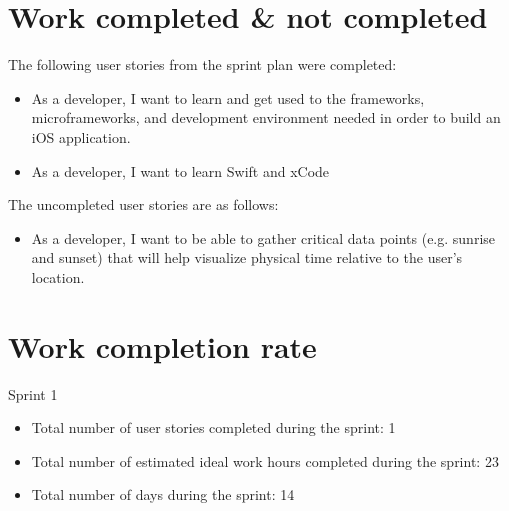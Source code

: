 \documentclass[11pt]{article}
\begin{document}
	\section{Work completed \& not completed}
		\vspace{-3mm}
		\normalsize{The following user stories from the sprint plan were completed:}\\
		\vspace{-3mm}
		\begin{itemize}
			\item As a developer, I want to learn and get used to the frameworks, microframeworks, and development environment needed in order to build an iOS application.
			\item As a developer, I want to learn Swift and xCode
		\end{itemize}
		\vspace{-3mm}
		\normalsize{The uncompleted user stories are as follows:}\\
		\vspace{-3mm}
		\begin{itemize}
			\item As a developer, I want to be able to gather critical data points (e.g. sunrise and sunset) that will help visualize physical time relative to the user's location.
		\end{itemize}
		\vspace{-3mm}

	\section{Work completion rate}
		\vspace{-3mm}
		\normalsize{Sprint 1}\\
		\vspace{-3mm}
		\begin{itemize}
			\item Total number of user stories completed during the sprint: 1
			\vspace{-3mm}
			\item Total number of estimated ideal work hours completed during the sprint: 23
			\vspace{-3mm}
			\item Total number of days during the sprint: 14
		\end{itemize}
\end{document}
